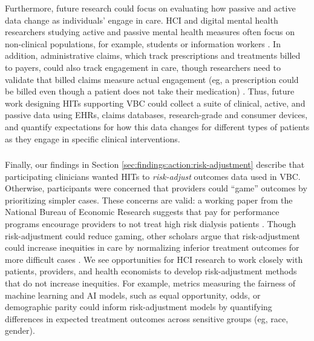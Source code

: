 Furthermore, future research could focus on evaluating how passive and active data change as individuals' engage in care.
HCI and digital mental health researchers studying active and passive mental health measures often focus on non-clinical populations, for example, students \cite{wang_studentlife_2014, nepal_capturing_2024, nepal_moodcapture_2024} or information workers \cite{nepal_workplace_2023, das_swain_sensible_2024}.
In addition, administrative claims, which track prescriptions and treatments billed to payers, could also track engagement in care, though researchers need to validate that billed claims measure actual engagement (eg, a prescription could be billed even though a patient does not take their medication) \cite{leslie_calculating_2008, yan_medication_2018}.
Thus, future work designing HITs supporting VBC could collect a suite of clinical, active, and passive data using EHRs, claims databases, research-grade and consumer devices, and quantify expectations for how this data changes for different types of patients as they engage in specific clinical interventions.

\subsubsection{}
\label{sec:discussion:tech:risk-adjustment}
Finally, our findings in Section \ref{sec:findings:action:risk-adjustment} describe that participating clinicians wanted HITs to \textit{risk-adjust} outcomes data used in VBC.
Otherwise, participants were concerned that providers could ``game'' outcomes by prioritizing simpler cases.
These concerns are valid: a working paper from the National Bureau of Economic Research suggests that pay for performance programs encourage providers to not treat high risk dialysis patients \cite{bertuzzi_gaming_2023}.
Though risk-adjustment could reduce gaming, other scholars argue that risk-adjustment could increase inequities in care by normalizing inferior treatment outcomes for more difficult cases \cite{jacobs_cms_2023}.
We see opportunities for HCI research to work closely with patients, providers, and health economists to develop risk-adjustment methods that do not increase inequities.
For example, metrics measuring the fairness of machine learning and AI models, such as equal opportunity, odds, or demographic parity \cite{hardt_equality_2016, kallus_fairness_2019, kleinberg_inherent_2016} could inform risk-adjustment models by quantifying differences in expected treatment outcomes across sensitive groups (eg, race, gender).

